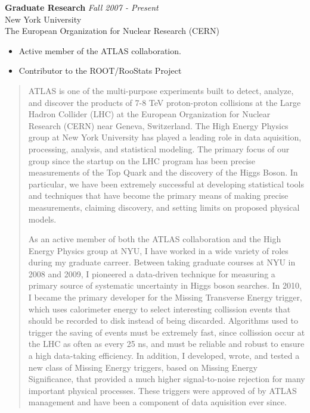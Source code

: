 \documentclass[9pt]{article}
\newenvironment{changemargin}[2]{%
  \begin{list}{}{%
    \setlength{\topsep}{0pt}%
    \setlength{\leftmargin}{#1}%
    \setlength{\rightmargin}{#2}%
    \setlength{\listparindent}{\parindent}%
    \setlength{\itemindent}{\parindent}%
    \setlength{\parsep}{\parskip}%
  }%
  \item[]}{\end{list}
}
\newenvironment{body} {
	\vspace*{-16pt}
	\begin{changemargin}{-0.25in}{-0.5in}
  }	
	{\end{changemargin}
}
\begin{document}
\begin{body}
	\vspace{14pt}
	\textbf{Graduate Research} \hfill \emph{Fall 2007 - Present}\\
	New York University \\
        The European Organization for Nuclear Research (CERN) \\

	\vspace*{-4pt}

	\begin{itemize} \itemsep -0pt  %
		\item Active member of the ATLAS collaboration.
                \item Contributor to the ROOT/RooStats Project
	\end{itemize}

        \begin{quotation}
          \raggedright
          ATLAS is one of the multi-purpose experiments built to detect, analyze, and discover the products of 7-8 TeV proton-proton collisions at the Large Hadron Collider (LHC) at the European Organization for Nuclear Research (CERN) near Geneva, Switzerland.
          The High Energy Physics group at New York University has played a leading role in data aquisition, processing, analysis, and statistical modeling.
          The primary focus of our group since the startup on the LHC program has been precise measurements of the Top Quark and the discovery of the Higgs Boson.
          In particular, we have been extremely successful at developing statistical tools and techniques that have become the primary means of making precise measurements, claiming discovery, and setting limits on proposed physical models. \\
          \par
          As an active member of both the ATLAS collaboration and the High Energy Physics group at NYU, I have worked in a wide variety of roles during my graduate carreer.
          Between taking graduate courses at NYU in 2008 and 2009, I pioneered a data-driven technique for measuring a primary source of systematic uncertainty in Higgs boson searches.
          In 2010, I became the primary developer for the Missing Transverse Energy trigger, which uses calorimeter energy to select interesting collission events that should be recorded to disk instead of being discarded.
          Algorithms used to trigger the saving of events must be extremely fast, since collission occur at the LHC as often as every 25 ns, and must be reliable and robust to ensure a high data-taking efficiency.
          In addition, I developed, wrote, and tested a new class of Missing Energy triggers, based on Missing Energy Significance, that provided a much higher signal-to-noise rejection for many important physical processes.
          These triggers were approved of by ATLAS management and have been a component of data aquisition ever since.
          


\end{quotation}
\end{body}
\end{document}
